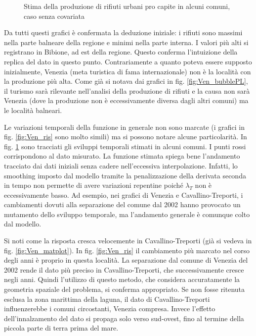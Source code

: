 \documentclass[a4paper,11pt,twoside,openright]{book}							%
\begin{document}
\begin{figure}[t]
{   }
	\caption{Stima della produzione di rifiuti urbani pro capite in alcuni comuni, caso senza covariata}
	\label{fig:Ven_tempo}
\end{figure}

Da tutti questi grafici è confermata la deduzione iniziale: i rifiuti sono massimi nella parte balneare della regione e minimi nella parte interna. I valori più alti si registrano in Bibione, ad est della regione. Questo conferma l'intuizione della replica del dato in questo punto. Contrariamente a quanto poteva essere supposto inizialmente, Venezia (meta turistica di fama internazionale) non è la località con la produzione più alta. Come già si notava dai grafici in fig. \ref{fig:Ven_bubblePL}, il turismo sarà rilevante nell'analisi della produzione di rifiuti e la causa non sarà Venezia (dove la produzione non è eccessivamente diversa dagli altri comuni) ma le località balneari.

Le variazioni temporali della funzione in generale non sono marcate (i grafici in fig. \ref{fig:Ven_ris} sono molto simili) ma si possono notare alcune particolarità. In fig. \ref{fig:Ven_tempo} sono tracciati gli sviluppi temporali stimati in alcuni comuni. I punti rossi corrispondono al dato misurato. La funzione stimata spiega bene l'andamento tracciato dai dati iniziali senza cadere nell'eccessiva interpolazione. Infatti, lo smoothing imposto dal modello tramite la penalizzazione della derivata seconda in tempo non permette di avere variazioni repentine poiché $\lambda_T$ non è eccessivamente basso. Ad esempio, nei grafici di Venezia e Cavallino-Treporti, i cambiamenti dovuti alla separazione del comune dal 2002 hanno provocato un mutamento dello sviluppo temporale, ma l'andamento generale è comunque colto dal modello. 

Si noti come la risposta cresca velocemente in Cavallino-Treporti (già si vedeva in fig. \ref{fig:Ven_matplot}). In fig. \ref{fig:Ven_ris} il cambiamento più marcato nel corso degli anni è proprio in questa località. La separazione dal comune di Venezia del 2002 rende il dato più preciso in Cavallino-Treporti, che successivamente cresce negli anni. Quindi l'utilizzo di questo metodo, che considera accuratamente la geometria spaziale del problema, si conferma appropriato. Se non fosse ritenuta esclusa la zona marittima della laguna, il dato di Cavallino-Treporti influenzerebbe i comuni circostanti, Venezia compresa. Invece l'effetto dell'innalzamento del dato si propaga solo verso sud-ovest, fino al termine della piccola parte di terra prima del mare.
\end{document}
